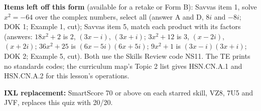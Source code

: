 \documentclass[11pt]{article}
\begin{document}
\textbf{Items left off this form} (available for a retake or Form B): Savvas item 1, solve $x^2=-64$ over the complex numbers, select all (answer A and D, $8i$ and $-8i$; DOK 1; Example 1, cut); Savvas item 5, match each product with its factors (answers: $18x^2+2$ is $2$, $(3x-i)$, $(3x+i)$; $3x^2+12$ is $3$, $(x-2i)$, $(x+2i)$; $36x^2+25$ is $(6x-5i)(6x+5i)$; $9x^2+1$ is $(3x-i)(3x+i)$; DOK 2; Example 5, cut). Both use the Skills Review code NS11. The TE prints no standards codes; the curriculum map's Topic 2 list gives HSN.CN.A.1 and HSN.CN.A.2 for this lesson's operations.

\textbf{IXL replacement:} SmartScore 70 or above on each starred skill, VZ8, 7U5 and JVF, replaces this quiz with 20/20.
\end{document}
